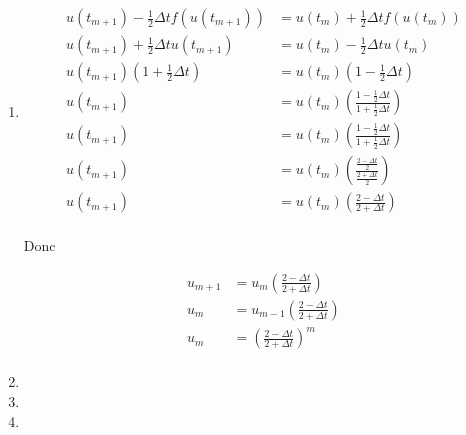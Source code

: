 \documentclass[12pt, letterpaper]{article}
\begin{document}
\begin{enumerate}
\item

  \begin{equation*}
    \begin{split}
        u(t_{m + 1}) - \frac{1}{2} \Delta t f(u(t_{m+1})) & = u(t_m) +
        \frac{1}{2} \Delta t f(u(t_m)) \\
        u(t_{m + 1}) + \frac{1}{2} \Delta t u(t_{m+1}) & = u(t_m) -
        \frac{1}{2} \Delta t u(t_m) \\
        u(t_{m + 1}) \left(1 + \frac{1}{2} \Delta t \right) & = u(t_m) \left( 1 -
        \frac{1}{2} \Delta t \right) \\
        u(t_{m + 1})  & = u(t_m) \left( \frac{1 - \frac{1}{2} \Delta
          t}{1 + \frac{1}{2} \Delta t} \right) \\
        u(t_{m + 1})  & = u(t_m) \left( \frac{1 - \frac{1}{2} \Delta
          t}{1 + \frac{1}{2} \Delta t} \right) \\
        u(t_{m + 1})  & = u(t_m) \left( \frac{\frac{2 - \Delta
          t}{2} }{\frac{2 + \Delta t}{2}} \right) \\
        u(t_{m + 1})  & = u(t_m) \left( \frac{2 - \Delta
          t}{2 + \Delta t} \right) \\
    \end{split}
  \end{equation*}

  Donc

    \begin{equation*}
      \begin{split}
        u_{m + 1}  & = u_m \left( \frac{2 - \Delta
          t}{2 + \Delta t} \right) \\
        u_m  & = u_{m-1} \left( \frac{2 - \Delta
          t}{2 + \Delta t} \right) \\
        u_m  & = \left( \frac{2 - \Delta
          t}{2 + \Delta t} \right)^m \\
      \end{split}
    \end{equation*}

\item

\item

\item
  
\end{enumerate}
\end{document}
